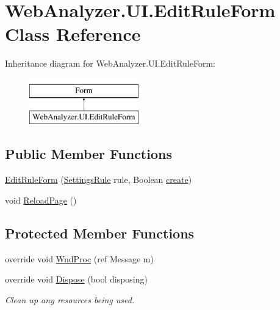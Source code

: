 \hypertarget{class_web_analyzer_1_1_u_i_1_1_edit_rule_form}{}\section{Web\+Analyzer.\+U\+I.\+Edit\+Rule\+Form Class Reference}
\label{class_web_analyzer_1_1_u_i_1_1_edit_rule_form}
Inheritance diagram for Web\+Analyzer.\+U\+I.\+Edit\+Rule\+Form\+:\begin{figure}[H]
\begin{center}
\leavevmode
\includegraphics[height=2.000000cm]{class_web_analyzer_1_1_u_i_1_1_edit_rule_form}
\end{center}
\end{figure}
\subsection*{Public Member Functions}
\begin{DoxyCompactItemize}
\item 
\hyperlink{class_web_analyzer_1_1_u_i_1_1_edit_rule_form_a808eb0a4efc018629ec1c5ce337d4533}{Edit\+Rule\+Form} (\hyperlink{class_web_analyzer_1_1_models_1_1_settings_model_1_1_settings_rule}{Settings\+Rule} rule, Boolean \hyperlink{_u_i_2_h_t_m_l_resources_2js_2lib_2underscore_8min_8js_a8bd5981157799459d39a59e8c4a0de04}{create})
\item 
void \hyperlink{class_web_analyzer_1_1_u_i_1_1_edit_rule_form_ac8507e10ea396307c0519ae8e13d8378}{Reload\+Page} ()
\end{DoxyCompactItemize}
\subsection*{Protected Member Functions}
\begin{DoxyCompactItemize}
\item 
override void \hyperlink{class_web_analyzer_1_1_u_i_1_1_edit_rule_form_a17f361a8d574576a1c2753b6cf70ca52}{Wnd\+Proc} (ref Message m)
\item 
override void \hyperlink{class_web_analyzer_1_1_u_i_1_1_edit_rule_form_ab1eaea9ca9d285938a31d96a5ada8a6a}{Dispose} (bool disposing)
\begin{DoxyCompactList}\small\item\em Clean up any resources being used. \end{DoxyCompactList}\end{DoxyCompactItemize}
